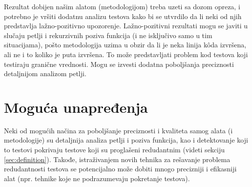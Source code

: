 \documentclass[a4paper]{article}
\begin{document}
Rezultat dobijen našim alatom (metodologijom) treba uzeti sa dozom opreza, i potrebno je vršiti dodatnu analizu testova kako bi se utvrdilo da li neki od njih predstavlja lažno-pozitivno upozorenje. Lažno-pozitivni rezultati mogu se javiti u slučaju petlji i rekurzivnih poziva funkcija (i ne isključivo samo u tim situacijama), pošto metodologija uzima u obzir da li je neka linija kôda izvršena, ali ne i to koliko je puta izvršena. To može predstavljati problem kod testova koji testiraju granične vrednosti. Mogu se izvesti dodatna poboljšanja preciznosti detaljnijom analizom petlji.

\section{Moguća unapređenja}
\label{sec:unapredjenja}
Neki od mogućih načina za poboljšanje preciznosti i kvaliteta samog alata (i metodologije) su detaljnija analiza petlji i poziva funkcija, kao i detektovanje koji to testovi pokrivaju testove koji su proglašeni redudantnim (videti sekciju \ref{sec:definition}). Takođe, istraživanjem novih tehnika za rešavanje problema redudantnosti testova se potencijalno može dobiti mnogo precizniji i efikasniji alat (npr. tehnike koje ne podrazumevaju pokretanje testova).
\end{document}
